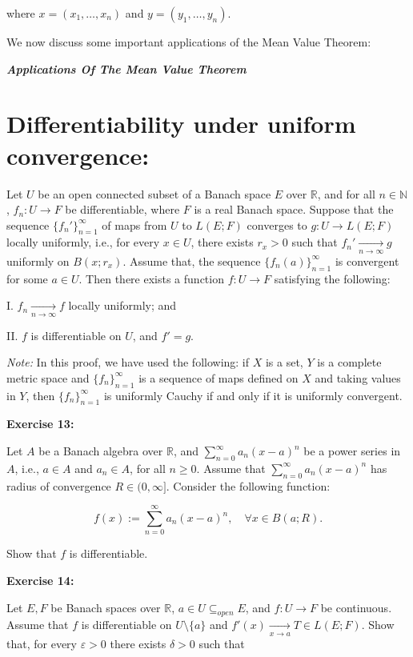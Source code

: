 \documentclass{book}
\begin{document}
where $x = (x_1, \ldots, x_n)$ and $y = (y_1, \ldots, y_n)$.

We now discuss some important applications of the Mean Value Theorem:


\begin{center}
    \textbf{\textit{Applications Of The Mean Value Theorem}}
\end{center}

\section*{\textbf{Differentiability under uniform convergence:}}
Let $U$ be an open connected subset of a Banach space $E$ over $\mathbb{R}$, and for all $n \in \mathbb{N}$, $f_n : U \to F$ be differentiable, where $F$ is a real Banach space. Suppose that the sequence $\{f_n'\}_{n=1}^{\infty}$ of maps from $U$ to $L(E; F)$ converges to $g : U \to L(E; F)$ locally uniformly, i.e., for every $x \in U$, there exists $r_x > 0$ such that $f_n' \xrightarrow[n \to \infty]{} g$ uniformly on $B(x; r_x)$. Assume that, the sequence $\{f_n(a)\}_{n=1}^{\infty}$ is convergent for some $a \in U$. Then there exists a function $f : U \to F$ satisfying the following:

I. $f_n \xrightarrow[n \to \infty]{} f$ locally uniformly; and

II. $f$ is differentiable on $U$, and $f' = g$.

\textit{Note:} In this proof, we have used the following: if $X$ is a set, $Y$ is a complete metric space and $\{f_n\}_{n=1}^{\infty}$ is a sequence of maps defined on $X$ and taking values in $Y$, then $\{f_n\}_{n=1}^{\infty}$ is uniformly Cauchy if and only if it is uniformly convergent.

\textbf{Exercise 13:}

Let $A$ be a Banach algebra over $\mathbb{R}$, and $\sum_{n=0}^{\infty} a_n(x - a)^n$ be a power series in $A$, i.e., $a \in A$ and $a_n \in A$, for all $n \geq 0$. Assume that $\sum_{n=0}^{\infty} a_n(x - a)^n$ has radius of convergence $R \in (0, \infty]$. Consider the following function:

\[
f(x) := \sum_{n=0}^{\infty} a_n(x - a)^n, \quad \forall x \in B(a; R).
\]

Show that $f$ is differentiable.

\textbf{Exercise 14:}

Let $E, F$ be Banach spaces over $\mathbb{R}$, $a \in U \subseteq_{open} E$, and $f : U \to F$ be continuous. Assume that $f$ is differentiable on $U \setminus \{a\}$ and $f'(x) \xrightarrow[x \to a]{} T \in L(E; F)$. Show that, for every $\varepsilon > 0$ there exists $\delta > 0$ such that
\end{document}
